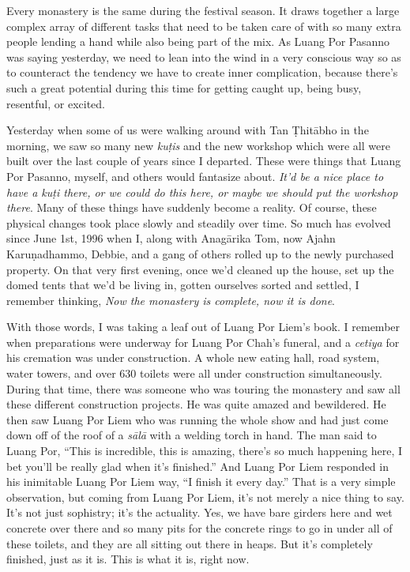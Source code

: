 Every monastery is the same during the festival season. It draws 
together a large complex array of different tasks that need to be taken 
care of with so many extra people lending a hand while also being part 
of the mix. As Luang Por Pasanno was saying yesterday, we need to lean 
into the wind in a very conscious way so as to counteract the tendency 
we have to create inner complication, because there's such a great 
potential during this time for getting caught up, being busy, 
resentful, or excited.

Yesterday when some of us were walking around with Tan Ṭhitābho in 
the morning, we saw so many new \emph{kuṭis} and the new workshop 
which were all were built over the last couple of years since I 
departed. These were things that Luang Por Pasanno, myself, and others 
would fantasize about. \emph{It'd be a nice place to have a kuṭi 
there, or we could do this here, or maybe we should put the workshop 
there}. Many of these things have suddenly become a reality. Of course, 
these physical changes took place slowly and steadily over time. So 
much has evolved since June 1st, 1996 when I, along with Anagārika 
Tom, now Ajahn Karuṇadhammo, Debbie, and a gang of others rolled up 
to the newly purchased property. On that very first evening, once we'd 
cleaned up the house, set up the domed tents that we'd be living in, 
gotten ourselves sorted and settled, I remember thinking, \emph{Now the 
monastery is complete, now it is done}.

With those words, I was taking a leaf out of Luang Por Liem's book. I 
remember when preparations were underway for Luang Por Chah's funeral, 
and a \emph{cetiya} for his cremation was under construction. A whole 
new eating hall, road system, water towers, and over 630 toilets were 
all under construction simultaneously. During that time, there was 
someone who was touring the monastery and saw all these different 
construction projects. He was quite amazed and bewildered. He then saw 
Luang Por Liem who was running the whole show and had just come down 
off of the roof of a \emph{sālā} with a welding torch in hand. The 
man said to Luang Por, ``This is incredible, this is amazing, there's 
so much happening here, I bet you'll be really glad when it's 
finished.'' And Luang Por Liem responded in his inimitable Luang Por 
Liem way, ``I finish it every day.'' That is a very simple observation, 
but coming from Luang Por Liem, it's not merely a nice thing to say. 
It's not just sophistry; it's the actuality. Yes, we have bare girders 
here and wet concrete over there and so many pits for the concrete 
rings to go in under all of these toilets, and they are all sitting out 
there in heaps. But it's completely finished, just as it is. This is 
what it is, right now.

